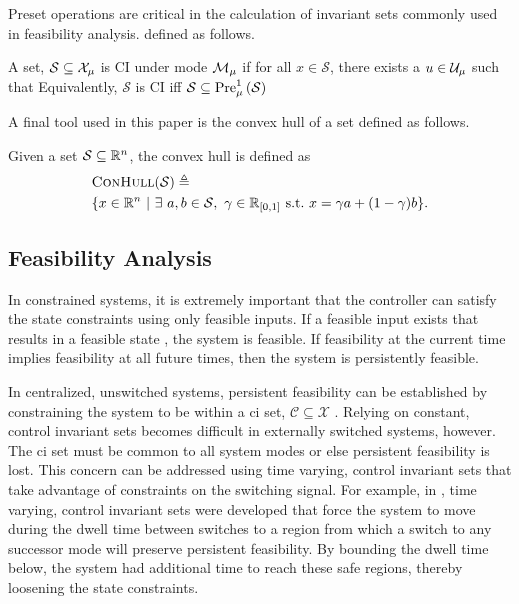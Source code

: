 Preset operations are critical in the calculation of invariant sets commonly used in feasibility analysis.  defined as follows.
\begin{definition}\label{def:ci_set}
A set, $\mathcal{S}\subseteq\xcon[\modeidx]$ is CI under mode $\mode{\modeidx}$ if for all $x\in\mathcal{S}$, there exists a $u\in\ucon[\modeidx]$ such that  Equivalently, $\mathcal{S}$ is CI iff $\mathcal{S}\subseteq\Pre[\modeidx][1]{\mathcal{S}}$
\end{definition}

A final tool used in this paper is the convex hull of a set defined as follows.
\begin{definition}
Given a set $\mathcal{S}\subseteq\mathbb{R}^n$, the convex hull is defined as 
\begin{align*}
&\Call{ConHull}{\mathcal{S}}\triangleq\\&\{x\in\real^n\ |\ \exists\ a,b\in\mathcal{S},\ \gamma\in\real\rii{0}{1}\ \text{s.t.}\ x=\gamma a + (1-\gamma)b\}.
\end{align*}
\end{definition}
\subsection{Feasibility Analysis}
In constrained systems, it is extremely important that the controller can satisfy the state constraints using only feasible inputs. If a feasible input exists that results in a feasible state , the system is feasible. If feasibility at the current time implies feasibility at all future times, then the system is persistently feasible.

In centralized, unswitched systems, persistent feasibility can be established by constraining the system to be within a \ac{ci} set, $\mathcal{C}\subseteq\mathcal{X}$ \cite{Blanchini1999}. Relying on constant, control invariant sets becomes difficult in externally switched systems, however. The \ac{ci} set must be common to all system modes or else persistent feasibility is lost. This concern can be addressed using time varying, control invariant sets that take advantage of constraints on the switching signal. For example, in \cite{Danielson2019,Santis2004,Lavaei2021,Athanasopoulos2017}, time varying, control invariant sets were developed that force the system to move during the dwell time between switches to a region from which a switch to any successor mode will preserve persistent feasibility. By bounding the dwell time below, the system had additional time to reach these safe regions, thereby loosening the state constraints.

